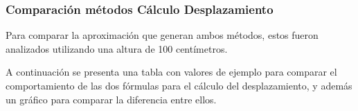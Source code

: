 \documentclass[12pt,a4paper]{article}
\begin{document}
\subsubsection{Comparación métodos Cálculo Desplazamiento}
Para comparar la aproximación que generan ambos métodos, estos fueron analizados utilizando una altura de 100 centímetros.

A continuación se presenta una tabla con valores de ejemplo para comparar el comportamiento de las dos fórmulas para el cálculo del desplazamiento, y además un gráfico para comparar la diferencia entre ellos.

\begin{figure}[H]
	\begin{subfigure}{.5\textwidth}
		

\end{subfigure}
\end{figure}
\end{document}
